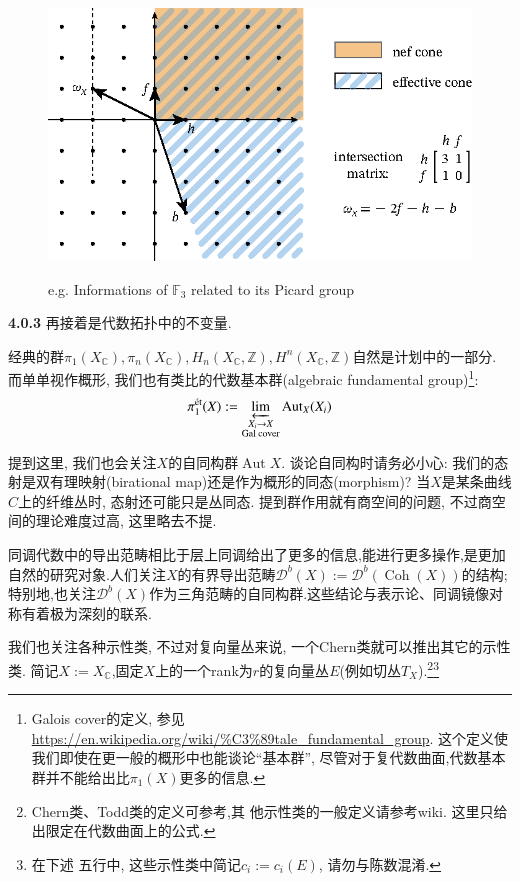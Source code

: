 \documentclass[UTF8,12pt,twoside]{article}
\theoremstyle{definition}
\newcommand{\ZZ}{\mathbb{Z}}  %
\newcommand{\CC}{\mathbb{C}}  %
\newcommand{\Aut}{\operatorname{Aut}}
\newcommand{\Coh}{\operatorname{Coh}}
\numberwithin{equation}{section}
\begin{document}
\begin{figure}[ht]
	\vspace{0cm}
	\centering
	\includegraphics[width=12cm]{9-7-fig/picofF385.eps}
	\label{fig:PicofF3}
	\captionsetup{labelformat=empty}
	\caption{e.g. Informations of $\mathbb{F}_3$ related to its Picard group}
\end{figure}


\textbf{4.0.3} 再接着是代数拓扑中的不变量.

经典的群$\pi_1(X_{\CC}),\pi_n(X_{\CC}),H_n(X_{\CC},\ZZ),H^n(X_{\CC},\ZZ)$自然是计划中的一部分. 而单单视作概形, 我们也有类比的代数基本群(algebraic fundamental group)\footnote{Galois cover的定义, 参见\url{https://en.wikipedia.org/wiki/\%C3\%89tale_fundamental_group}. 这个定义使我们即使在更一般的概形中也能谈论“基本群”, 尽管对于复代数曲面,代数基本群并不能给出比$\pi_1(X)$更多的信息.}:
$$\pi_1^{\text{ét}}(X):=\varprojlim_{\substack{X_i\rightarrow X \\ \text{Gal cover} }} \Aut_X(X_i)$$

提到这里, 我们也会关注$X$的自同构群$\Aut X$. 谈论自同构时请务必小心: 我们的态射是双有理映射(birational map)还是作为概形的同态(morphism)? 当$X$是某条曲线$C$上的纤维丛时, 态射还可能只是丛同态. 提到群作用就有商空间的问题, 不过商空间的理论难度过高, 这里略去不提.

同调代数中的导出范畴相比于层上同调给出了更多的信息,能进行更多操作,是更加自然的研究对象.人们关注$X$的有界导出范畴$\mathcal{D}^b(X):= \mathcal{D}^b(\Coh(X))$的结构\cite[Theorem 6.1]{sosnatriangulated};特别地,也关注$\mathcal{D}^b(X)$作为三角范畴的自同构群\cite[Theorem 8.1,8.3,9.9]{sosnatriangulated}.这些结论与表示论、同调镜像对称有着极为深刻的联系.

我们也关注各种示性类, 不过对复向量丛来说, 一个Chern类就可以推出其它的示性类. 简记$X:=X_{\CC}$,固定$X$上的一个rank为$r$的复向量丛$E$(例如切丛$T_X$).\footnote{Chern类、Todd类的定义可参考\cite[Class 18]{vakil2004algsurf},其 他示性类的一般定义请参考wiki. 这里只给出限定在代数曲面上的公式.}\footnote{在下述 五行中, 这些示性类中简记$c_i:=c_i(E)$, 请勿与陈数混淆.} 
\end{document}
